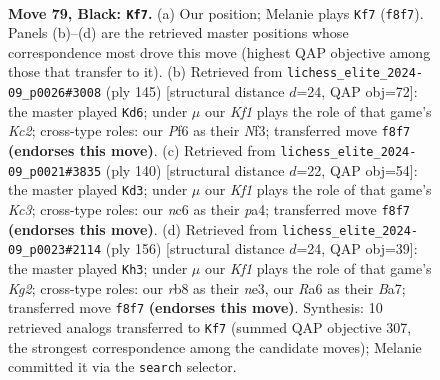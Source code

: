 \documentclass[11pt]{article}
\begin{document}
\clearpage

\begin{figure}[p]\centering
\begin{subfigure}{0.46\textwidth}\centering
\resizebox{\linewidth}{!}{%
\newchessgame
\chessboard[
  setfen={1R3k2/6p1/r1N2p2/7p/3P3P/6P1/5K2/8 b - - 52 79},
  showmover=false,
  pgfstyle=straightmove, color=movearrow, markmove={f8-f7}
]}
\caption{}
\end{subfigure}\hfill
\begin{subfigure}{0.46\textwidth}\centering
\resizebox{\linewidth}{!}{%
\newchessgame
\chessboard[
  setfen={8/2k3R1/2p5/p6r/N7/1PP2n2/2K5/8 b - - 16 73},
  showmover=false,
  pgfstyle=straightmove, color=movearrow, markmove={c7-d6}
]}
\caption{}
\end{subfigure}
\\[4pt]
\begin{subfigure}{0.46\textwidth}\centering
\resizebox{\linewidth}{!}{%
\newchessgame
\chessboard[
  setfen={8/R7/2r1p1k1/5p2/p4P2/P1K5/1P6/8 w - - 8 71},
  showmover=false,
  pgfstyle=straightmove, color=movearrow, markmove={c3-d3}
]}
\caption{}
\end{subfigure}\hfill
\begin{subfigure}{0.46\textwidth}\centering
\resizebox{\linewidth}{!}{%
\newchessgame
\chessboard[
  setfen={8/B7/6p1/5p1p/5P1P/4n1P1/4k1K1/8 w - - 30 79},
  showmover=false,
  pgfstyle=straightmove, color=movearrow, markmove={g2-h3}
]}
\caption{}
\end{subfigure}
\caption{\textbf{Move 79, Black: \texttt{Kf7}.} (a) Our position; Melanie plays \texttt{Kf7} (\texttt{f8f7}). Panels (b)--(d) are the retrieved master positions whose correspondence most drove this move (highest QAP objective among those that transfer to it). (b) Retrieved from \texttt{lichess\_elite\_2024-09\_p0026\#3008} (ply 145) [structural distance $d$=24, QAP obj=72]: the master played \texttt{Kd6}; under $\mu$ our \emph{Kf1} plays the role of that game's \emph{Kc2}; cross-type roles: our \emph{P}f6 as their \emph{N}f3; transferred move \texttt{f8f7} \textbf{(endorses this move)}. (c) Retrieved from \texttt{lichess\_elite\_2024-09\_p0021\#3835} (ply 140) [structural distance $d$=22, QAP obj=54]: the master played \texttt{Kd3}; under $\mu$ our \emph{Kf1} plays the role of that game's \emph{Kc3}; cross-type roles: our \emph{n}c6 as their \emph{p}a4; transferred move \texttt{f8f7} \textbf{(endorses this move)}. (d) Retrieved from \texttt{lichess\_elite\_2024-09\_p0023\#2114} (ply 156) [structural distance $d$=24, QAP obj=39]: the master played \texttt{Kh3}; under $\mu$ our \emph{Kf1} plays the role of that game's \emph{Kg2}; cross-type roles: our \emph{r}b8 as their \emph{n}e3, our \emph{R}a6 as their \emph{B}a7; transferred move \texttt{f8f7} \textbf{(endorses this move)}. Synthesis: 10 retrieved analogs transferred to \texttt{Kf7} (summed QAP objective 307, the strongest correspondence among the candidate moves); Melanie committed it via the \texttt{search} selector.}
\label{fig:thought-m157}
\end{figure}
\end{document}
